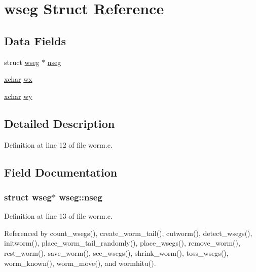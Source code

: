 \hypertarget{structwseg}{\section{wseg Struct Reference}
\label{structwseg}
}
\subsection*{Data Fields}
\begin{DoxyCompactItemize}
\item 
struct \hyperlink{structwseg}{wseg} $\ast$ \hyperlink{structwseg_ae644fa0cb01dacf54cc5a17c614cd313}{nseg}
\item 
\hyperlink{global_8h_a2043b7d01ce89f4ee2fa6c345a752d32}{xchar} \hyperlink{structwseg_abb5c94582c1ae01368b39d77126cafa1}{wx}
\item 
\hyperlink{global_8h_a2043b7d01ce89f4ee2fa6c345a752d32}{xchar} \hyperlink{structwseg_a5f5c26867c4c0aa0ab85e11fdfc93945}{wy}
\end{DoxyCompactItemize}


\subsection{Detailed Description}


Definition at line 12 of file worm.\+c.



\subsection{Field Documentation}
\hypertarget{structwseg_ae644fa0cb01dacf54cc5a17c614cd313}{
\subsubsection[{nseg}]{\setlength{\rightskip}{0pt plus 5cm}struct {\bf wseg}$\ast$ wseg\+::nseg}}\label{structwseg_ae644fa0cb01dacf54cc5a17c614cd313}


Definition at line 13 of file worm.\+c.



Referenced by count\+\_\+wsegs(), create\+\_\+worm\+\_\+tail(), cutworm(), detect\+\_\+wsegs(), initworm(), place\+\_\+worm\+\_\+tail\+\_\+randomly(), place\+\_\+wsegs(), remove\+\_\+worm(), rest\+\_\+worm(), save\+\_\+worm(), see\+\_\+wsegs(), shrink\+\_\+worm(), toss\+\_\+wsegs(), worm\+\_\+known(), worm\+\_\+move(), and wormhitu().

